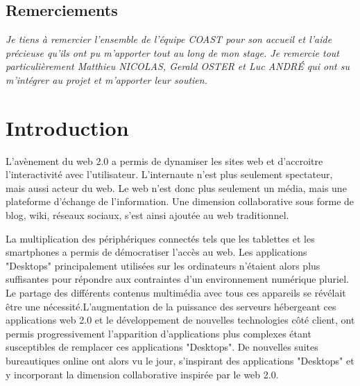 \documentclass{tnreport}
\begin{document}
  
\maketitle
{}


\cleardoublepage

\makesecondtitle

\section*{Remerciements}

{\em
Je tiens à remercier l'ensemble de l'équipe COAST pour son accueil et l'aide précieuse qu'ils ont pu m'apporter tout au long de mon stage.
Je remercie tout particulièrement Matthieu NICOLAS, Gerald OSTER et Luc ANDRÉ qui ont su m'intégrer au projet et m'apporter leur soutien.
}

\cleardoublepage

\renewcommand{\baselinestretch}{0.5}\normalsize
\tableofcontents
\renewcommand{\baselinestretch}{1.0}\normalsize
\cleardoublepage

\setcounter{page}{1}

\chapter{Introduction}

L'avènement du web 2.0 a permis de dynamiser les sites web et d'accroitre l'interactivité avec l'utilisateur. L'internaute n'est plus 
seulement spectateur, mais aussi acteur du web. Le web n'est donc plus seulement un média, mais une plateforme d'échange de 
l'information. Une dimension collaborative sous forme de blog, wiki, réseaux sociaux, s'est ainsi ajoutée au web traditionnel. 

La multiplication des périphériques connectés tels que les tablettes et les smartphones a permis de démocratiser l'accès au web. 
Les applications "Desktops" principalement utilisées sur les ordinateurs n'étaient alors plus suffisantes pour répondre aux contraintes
d'un environnement numérique pluriel. Le partage des différents contenus multimédia avec tous ces appareils se révélait être une 
nécessité.L'augmentation de la puissance des serveurs hébergeant ces applications web 2.0 et le développement de nouvelles technologies côté client, ont permis progressivement l'apparition d'applications plus complexes étant susceptibles de remplacer ces applications "Desktops". De nouvelles suites bureautiques online ont alors vu le jour, s'inspirant des applications "Desktops" et y incorporant la dimension collaborative inspirée par le web 2.0. 
\end{document}
